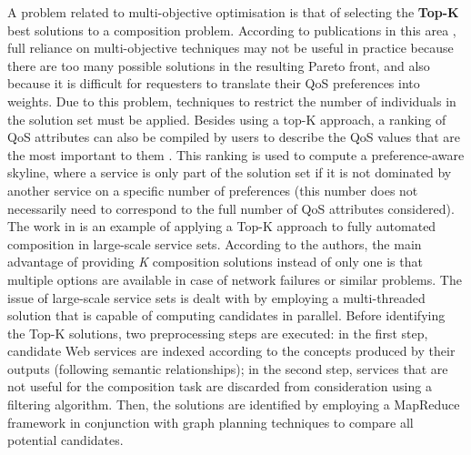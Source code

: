 A problem related to multi-objective optimisation is that of selecting the \textbf{Top-K} best solutions to a composition problem. According to publications in this area \cite{zhang2013selecting}, full reliance on multi-objective techniques may not be useful in practice because there are too many possible solutions in the resulting Pareto front, and also because it is difficult for requesters to translate their QoS preferences into weights. Due to this problem, techniques to restrict the number of individuals in the solution set must be applied. Besides using a top-K approach, a ranking of QoS attributes can also be compiled by users to describe the QoS values that are the most important to them \cite{zhang2013selecting}. This ranking is used to compute a preference-aware skyline, where a service is only part of the solution set if it is not dominated by another service
on a specific number of preferences (this number does not necessarily need to correspond to the full number of QoS attributes considered). The work in \cite{deng2014top} is an example of applying a Top-K approach to fully automated composition in large-scale service sets. According to the authors, the main advantage of providing \textit{K} composition solutions instead of only one is that multiple options are available in case of network failures or similar problems. The issue of large-scale service sets is dealt with by employing a multi-threaded solution that is capable of computing candidates in parallel. Before identifying the Top-K solutions, two preprocessing steps are executed: in the first step, candidate Web services are indexed according to the concepts produced by their outputs (following semantic relationships); in the second step, services that are not useful for the composition task are discarded from consideration using a filtering algorithm. Then, the solutions are identified by employing a MapReduce framework in conjunction with graph planning techniques to compare all potential candidates.

